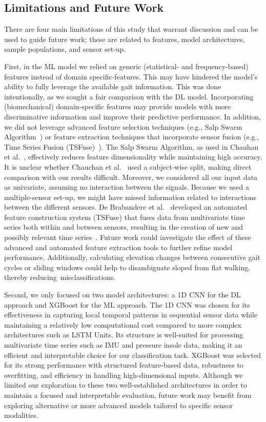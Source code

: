 \documentclass[sensors,article,accept,pdftex,moreauthors]{Definitions/mdpi}
\begin{document}
\subsection{Limitations and Future Work}
There are four main limitations of this study that warrant discussion and can be used to guide future work; these are related to features, model architectures, sample populations, and sensor set-up. 

First, in the ML model we relied on generic (statistical- and frequency-based) features instead of domain specific-features. This may have hindered the model's ability to fully leverage the available gait information. This was done intentionally, as we sought a fair comparison with the DL model. Incorporating (biomechanical) domain-specific features may provide models with more discriminative information and improve their predictive performance. In addition, we did not leverage advanced feature selection techniques (e.g., Salp Swarm Algorithm~\cite{mirjalili2017salp}) or feature extraction techniques that incorporate sensor fusion (e.g., Time Series Fusion (TSFuse)~\cite{de2024tsfuse}). The Salp Swarm Algorithm, as used in Chauhan et al.~\cite{chauhan2025classifying}, effectively reduces feature dimensionality while maintaining high accuracy. It is unclear whether Chauchan et al.~\cite{chauhan2025classifying} used a subject-wise split, making direct comparison with our results difficult. Moreover, we considered all our input data as univariate,  assuming no interaction between the signals. Because we used a multiple-sensor set-up, we might have missed information related to interactions between the different sensors. De Brabandere et al.~\cite{de2024tsfuse} developed an automated feature construction system (TSFuse) that fuses data from multivariate time series both within and between sensors, resulting in the creation of new and possibly relevant time series~\cite{de2024tsfuse}. Future work could investigate the effect of these advanced and automated feature extraction tools to further refine model performance.
\textcolor{revision}{Additionally, calculating elevation changes between consecutive gait cycles or sliding windows could help to disambiguate sloped from flat walking, thereby \mbox{reducing misclassifications}.}

Second, we only focused on two model architectures: a 1D CNN for the DL approach and XGBoost for the ML approach. The 1D CNN was chosen for its effectiveness in capturing local temporal patterns in sequential sensor data while maintaining a relatively low computational cost compared to more complex architectures such as LSTM Units. Its structure is well-suited for processing multivariate time series such as IMU and pressure insole data, making it an efficient and interpretable choice for our classification task. XGBoost was selected for its strong performance with structured feature-based data, robustness to overfitting, and efficiency in handling high-dimensional inputs. Although we limited our exploration to these two well-established architectures in order to maintain a focused and interpretable evaluation, future work may benefit from exploring alternative or more advanced models tailored to specific sensor modalities.
\end{document}
